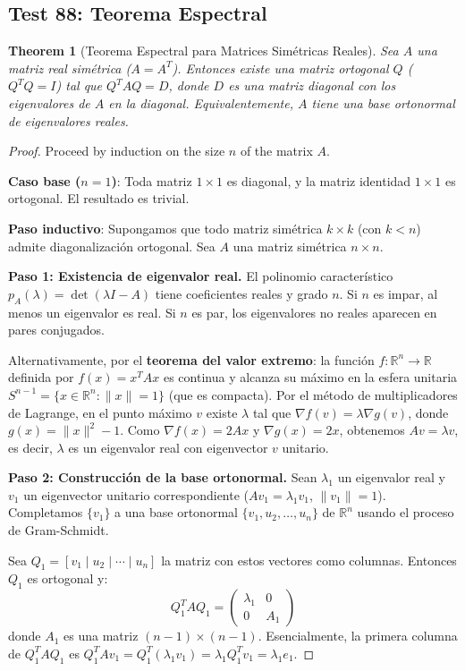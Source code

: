 \documentclass[11pt,a4paper]{article}
\theoremstyle{plain}
\newtheorem{theorem}{Theorem}[section]
\theoremstyle{definition}
\begin{document}
\subsection{Test 88: Teorema Espectral}

\begin{theorem}[Teorema Espectral para Matrices Simétricas Reales]
Sea $A$ una matriz real simétrica ($A = A^T$). Entonces existe una matriz ortogonal $Q$ ($Q^T Q = I$) tal que $Q^T A Q = D$, donde $D$ es una matriz diagonal con los eigenvalores de $A$ en la diagonal. Equivalentemente, $A$ tiene una base ortonormal de eigenvalores reales.
\end{theorem}

\begin{proof}
Proceed by induction on the size $n$ of the matrix $A$.

\textbf{Caso base ($n = 1$)}: Toda matriz $1 \times 1$ es diagonal, y la matriz identidad $1 \times 1$ es ortogonal. El resultado es trivial.

\textbf{Paso inductivo}: Supongamos que todo matriz simétrica $k \times k$ (con $k < n$) admite diagonalización ortogonal. Sea $A$ una matriz simétrica $n \times n$.

\textbf{Paso 1: Existencia de eigenvalor real.} El polinomio característico $p_A(\lambda) = \det(\lambda I - A)$ tiene coeficientes reales y grado $n$. Si $n$ es impar, al menos un eigenvalor es real. Si $n$ es par, los eigenvalores no reales aparecen en pares conjugados.

Alternativamente, por el \textbf{teorema del valor extremo}: la función $f: \mathbb{R}^n \to \mathbb{R}$ definida por $f(x) = x^T A x$ es continua y alcanza su máximo en la esfera unitaria $S^{n-1} = \{x \in \mathbb{R}^n : \|x\| = 1\}$ (que es compacta). Por el método de multiplicadores de Lagrange, en el punto máximo $v$ existe $\lambda$ tal que $\nabla f(v) = \lambda \nabla g(v)$, donde $g(x) = \|x\|^2 - 1$. Como $\nabla f(x) = 2Ax$ y $\nabla g(x) = 2x$, obtenemos $Av = \lambda v$, es decir, $\lambda$ es un eigenvalor real con eigenvector $v$ unitario.

\textbf{Paso 2: Construcción de la base ortonormal.} Sean $\lambda_1$ un eigenvalor real y $v_1$ un eigenvector unitario correspondiente ($Av_1 = \lambda_1 v_1$, $\|v_1\| = 1$). Completamos $\{v_1\}$ a una base ortonormal $\{v_1, u_2, \ldots, u_n\}$ de $\mathbb{R}^n$ usando el proceso de Gram-Schmidt.

Sea $Q_1 = [v_1 \mid u_2 \mid \cdots \mid u_n]$ la matriz con estos vectores como columnas. Entonces $Q_1$ es ortogonal y:
\[
Q_1^T A Q_1 = \begin{pmatrix} \lambda_1 & 0 \\ 0 & A_1 \end{pmatrix}
\]
donde $A_1$ es una matriz $(n-1) \times (n-1)$. Esencialmente, la primera columna de $Q_1^T A Q_1$ es $Q_1^T A v_1 = Q_1^T (\lambda_1 v_1) = \lambda_1 Q_1^T v_1 = \lambda_1 e_1$.


\end{proof}
\end{document}

